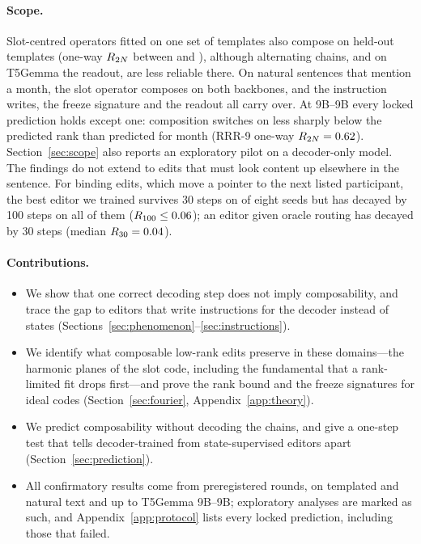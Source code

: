 \paragraph{Scope.}
%
Slot-centred operators fitted on one set of templates also compose on held-out templates (one-way $R_{2N}$ between
\CLfourteenBaseHour{} and \CLfourteenBaseMonth{}), although alternating chains, and on T5Gemma the readout, are less reliable there. On
\CLseventeenWorlds{} natural sentences that mention a month, the slot operator composes on both backbones, and the instruction writes,
the freeze signature and the readout all carry over. At 9B--9B every locked prediction holds except one: composition switches on less
sharply below the predicted rank than predicted for month (RRR-9 one-way $R_{2N}=0.62$).
Section~\ref{sec:scope} also reports an exploratory pilot on a decoder-only model. The findings do not extend to edits that must look
content up elsewhere in the sentence. For binding edits, which move a pointer to the next listed participant, the best editor we
trained survives 30 steps on \CLthirteenSurvivors{} of eight seeds but has decayed by 100 steps on all of them
($R_{100}\le0.06$); an editor given oracle routing has decayed by 30 steps (median $R_{30}=0.04$).

\paragraph{Contributions.}
\begin{itemize}
\item We show that one correct decoding step does not imply composability, and trace the gap to editors that write instructions for the
decoder instead of states (Sections~\ref{sec:phenomenon}--\ref{sec:instructions}).
\item We identify what composable low-rank edits preserve in these domains---the harmonic planes of the slot code, including the
fundamental that a rank-limited fit drops first---and prove the rank bound and the freeze signatures for ideal codes
(Section~\ref{sec:fourier}, Appendix~\ref{app:theory}).
\item We predict composability without decoding the chains, and give a one-step test that tells decoder-trained from state-supervised
editors apart (Section~\ref{sec:prediction}).
\item All confirmatory results come from \CLmetaRounds{} preregistered rounds, on templated and natural text and up to T5Gemma 9B--9B;
exploratory analyses are marked as such, and Appendix~\ref{app:protocol} lists every locked prediction, including those that failed.
\end{itemize}
